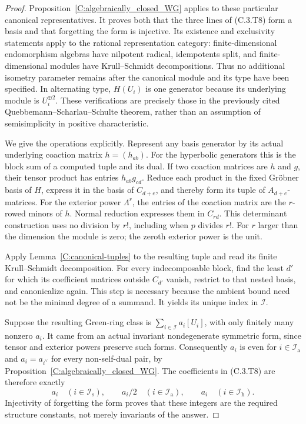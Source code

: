 \begin{proof}
Proposition~\ref{C:algebraically_closed_WG} applies to these particular
canonical representatives. It proves both that the three lines of
(C.3.T8) form a basis and that forgetting the form is injective. Its
existence and exclusivity statements apply to the rational representation
category: finite-dimensional endomorphism algebras have nilpotent
radical, idempotents split, and finite-dimensional modules have
Krull--Schmidt decompositions. Thus no additional isometry parameter
remains after the canonical module and its type have been specified.
In alternating type, $H(U_i)$ is one generator because its underlying
module is $U_i^{\oplus2}$. These verifications are precisely those in
the previously cited Quebbemann--Scharlau--Schulte theorem, rather than
an assumption of semisimplicity in positive characteristic.

We give the operations explicitly. Represent any basis generator by
its actual underlying coaction matrix $h=(h_{ab})$. For the hyperbolic
generators this is the block sum of a computed tuple and its dual.
If two coaction matrices are $h$ and $g$, their tensor product has entries
$h_{ab}g_{cd}$. Reduce each product in the fixed Gr\"obner basis of $H$,
express it in the basis of $C_{d+e}$, and thereby form its tuple of
$A_{d+e}$-matrices. For the exterior power $\Lambda^r$, the entries of
the coaction matrix are the $r$-rowed minors of $h$. Normal reduction
expresses them in $C_{rd}$. This determinant construction uses no division
by $r!$, including when $p$ divides $r!$. For $r$ larger than the
dimension the module is zero; the zeroth exterior power is the unit.

Apply Lemma~\ref{C:canonical-tuples} to the resulting tuple and read its
finite Krull--Schmidt decomposition. For every indecomposable block,
find the least $d'$ for which its coefficient matrices outside $C_{d'}$
vanish, restrict to that nested basis, and canonicalize again. This step
is necessary because the ambient bound need not be the minimal degree
of a summand. It yields its unique index in $\mathscr I$.

Suppose the resulting Green-ring class is
$\sum_{i\in\mathscr I}a_i[U_i]$, with only finitely many nonzero $a_i$.
It came from an actual invariant nondegenerate symmetric form, since
tensor and exterior powers preserve such forms. Consequently
$a_i$ is even for $i\in\mathscr I_{\mathrm a}$ and
$a_i=a_{i^\vee}$ for every non-self-dual pair, by
Proposition~\ref{C:algebraically_closed_WG}. The coefficients in
(C.3.T8) are therefore exactly
\[
 a_i\quad(i\in\mathscr I_{\mathrm s}),\qquad
 a_i/2\quad(i\in\mathscr I_{\mathrm a}),\qquad
 a_i\quad(i\in\mathscr I_{\mathrm h}).                     \tag{C.3.T9}
\]
Injectivity of forgetting the form proves that these integers are the
required structure constants, not merely invariants of the answer.


\end{proof}
